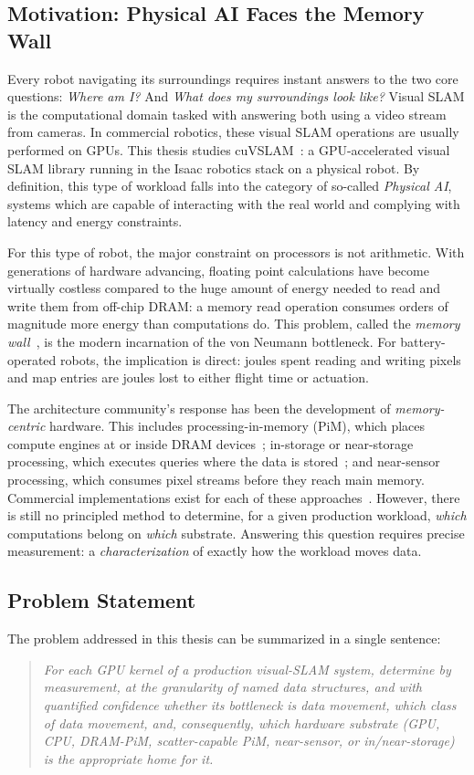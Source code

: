 
\subsection{Motivation: Physical AI Faces the Memory Wall}

Every robot navigating its surroundings requires instant answers to the two core questions: \emph{Where am I?} And \emph{What does my surroundings look like?} Visual SLAM is the computational domain tasked with answering both using a video stream from cameras. In commercial robotics, these visual SLAM operations are usually performed on GPUs. This thesis studies cuVSLAM~\cite{cuvslam2025}: a GPU-accelerated visual SLAM library running in the Isaac robotics stack on a physical robot. By definition, this type of workload falls into the category of so-called \emph{Physical AI}, systems which are capable of interacting with the real world and complying with latency and energy constraints.

For this type of robot, the major constraint on processors is not arithmetic. With generations of hardware advancing, floating point calculations have become virtually costless compared to the huge amount of energy needed to read and write them from off-chip DRAM: a memory read operation consumes orders of magnitude more energy than computations do. This problem, called the \emph{memory wall}~\cite{wulf1995memorywall}, is the modern incarnation of the von Neumann bottleneck. For battery-operated robots, the implication is direct: joules spent reading and writing pixels and map entries are joules lost to either flight time or actuation.

The architecture community's response has been the development of \emph{memory-centric} hardware. This includes processing-in-memory (PiM), which places compute engines at or inside DRAM devices~\cite{mutlu2019pim,ghose2019pim}; in-storage or near-storage processing, which executes queries where the data is stored~\cite{do2013smartssd,gu2016biscuit}; and near-sensor processing, which consumes pixel streams before they reach main memory. Commercial implementations exist for each of these approaches~\cite{gomezluna2021upmem,kwon2021hbmpim,lee2022aim}. However, there is still no principled method to determine, for a given production workload, \emph{which} computations belong on \emph{which} substrate. Answering this question requires precise measurement: a \emph{characterization} of exactly how the workload moves data.

\subsection{Problem Statement}
The problem addressed in this thesis can be summarized in a single sentence:
\begin{quote}
\emph{For each GPU kernel of a production visual-SLAM system, determine by measurement, at the granularity of named data structures, and with quantified confidence whether its bottleneck is data movement, which class of data movement, and, consequently, which hardware substrate (GPU, CPU, DRAM-PiM, scatter-capable PiM, near-sensor, or in/near-storage) is the appropriate home for it.}
\end{quote}

